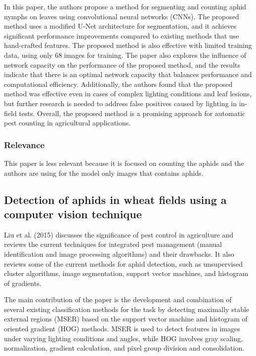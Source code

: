 \documentclass{article}
\begin{document}
In this paper, the authors propose a method for segmenting and counting aphid nymphs on leaves using convolutional
neural networks (CNNs). The proposed method uses a modified U-Net architecture for segmentation,
and it achieves significant performance improvements compared to existing methods that use hand-crafted features.
The proposed method is also effective with limited training data, using only 68 images for training.
The paper also explores the influence of network capacity on the performance of the proposed method,
and the results indicate that there is an optimal network capacity that balances performance and computational efficiency.
Additionally, the authors found that the proposed method was effective even in cases of complex lighting
conditions and leaf lesions, but further research is needed to address false positives caused by lighting in in-field tests.
Overall, the proposed method is a promising approach for automatic pest counting in agricultural applications.

\subsubsection*{Relevance}
This paper is less relevant because it is focused on counting the aphids and the authors are using for
the model only images that contains aphids.


\subsection*{Detection of aphids in wheat fields using a computer vision technique \cite{DetectionInWeatFields}}

Liu et al. (2015) discusses the significance of pest control in agriculture and reviews the
current techniques for integrated pest management (manual identification and image processing algorithms)
and their drawbacks. It also reviews some of the current methods for aphid detection, such as unsupervised
cluster algorithms, image segmentation, support vector machines, and histogram of gradients.


The main contribution of the paper is the development and combination of several existing classification methods
for the task by detecting maximally stable external regions (MSER) based on the support vector machine and
histogram of oriented gradient (HOG) methods. MSER is used to detect features in images under varying lighting
conditions and angles, while HOG involves gray scaling, normalization, gradient calculation,
and pixel group division and consolidation.
\end{document}
